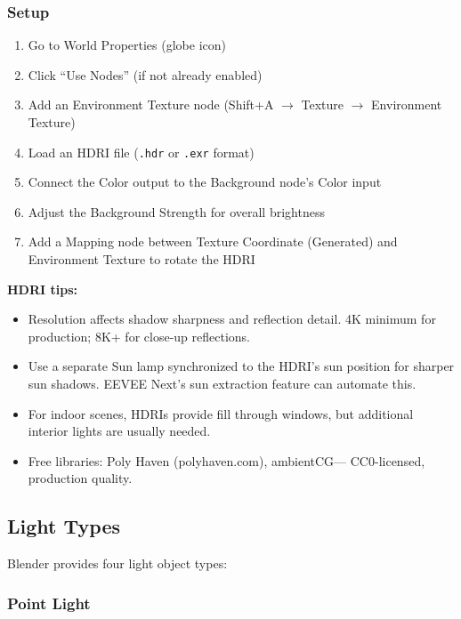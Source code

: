 \subsubsection{Setup}

\begin{enumerate}[leftmargin=2em]
  \item Go to World Properties (globe icon)
  \item Click ``Use Nodes'' (if not already enabled)
  \item Add an Environment Texture node (Shift+A $\rightarrow$
        Texture $\rightarrow$ Environment Texture)
  \item Load an HDRI file (\texttt{.hdr} or \texttt{.exr} format)
  \item Connect the Color output to the Background node's Color input
  \item Adjust the Background Strength for overall brightness
  \item Add a Mapping node between Texture Coordinate (Generated)
        and Environment Texture to rotate the HDRI
\end{enumerate}

\begin{tipbox}
\textbf{HDRI tips:}
\begin{itemize}[leftmargin=1.5em]
  \item Resolution affects shadow sharpness and reflection detail.
        4K minimum for production; 8K+ for close-up reflections.
  \item Use a separate Sun lamp synchronized to the HDRI's sun
        position for sharper sun shadows. EEVEE Next's sun
        extraction feature can automate this.
  \item For indoor scenes, HDRIs provide fill through windows, but
        additional interior lights are usually needed.
  \item Free libraries: Poly Haven (polyhaven.com), ambientCG---
        CC0-licensed, production quality.
\end{itemize}
\end{tipbox}

\subsection{Light Types}

Blender provides four light object types:

\subsubsection{Point Light}


